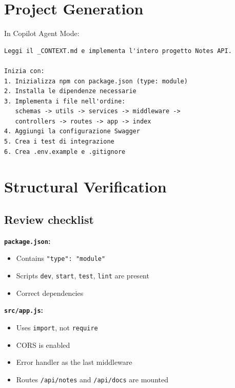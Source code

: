 \section{Project Generation}

\begin{praticabox}[title={Hands-on --- Initialization and generation}]
In Copilot Agent Mode:
\begin{lstlisting}[language={}]
Leggi il _CONTEXT.md e implementa l'intero progetto Notes API.

Inizia con:
1. Inizializza npm con package.json (type: module)
2. Installa le dipendenze necessarie
3. Implementa i file nell'ordine:
   schemas -> utils -> services -> middleware ->
   controllers -> routes -> app -> index
4. Aggiungi la configurazione Swagger
5. Crea i test di integrazione
6. Crea .env.example e .gitignore
\end{lstlisting}
\end{praticabox}

\section{Structural Verification}

\subsection*{Review checklist}

\textbf{\texttt{package.json}:}
\begin{itemize}
  \item Contains \texttt{"type": "module"}
  \item Scripts \texttt{dev}, \texttt{start}, \texttt{test}, \texttt{lint} are present
  \item Correct dependencies
\end{itemize}

\textbf{\texttt{src/app.js}:}
\begin{itemize}
  \item Uses \texttt{import}, not \texttt{require}
  \item CORS is enabled
  \item Error handler as the last middleware
  \item Routes \texttt{/api/notes} and \texttt{/api/docs} are mounted
\end{itemize}

